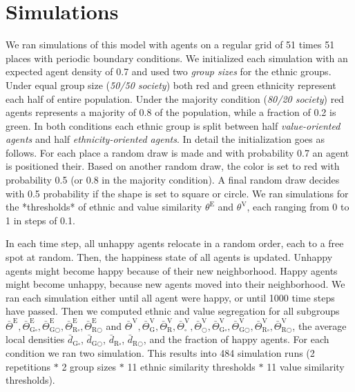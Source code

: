 \documentclass{ws-acs}
\begin{document}
{\section{Simulations}
We ran simulations of this model with agents on a regular grid of 51 times 51 places with periodic boundary conditions. We initialized each simulation with an expected agent density of 0.7 and used two {\it group sizes} for the ethnic groups. Under equal group size ({\it 50/50 society}) both red and green ethnicity represent each half of entire population. Under the majority condition ({\it 80/20 society}) red agents represents a majority of 0.8 of the population, while a fraction of 0.2 is green. In both conditions each ethnic group is split between half {\it value-oriented agents} and half {\it ethnicity-oriented agents}. In detail the initialization goes as follows. For each place a random draw is made and with probability 0.7 an agent is positioned their. Based on another random draw, the color is set to red with probability 0.5 (or 0.8 in the majority condition). A final random draw decides with 0.5 probability if the shape is set to square or circle. We ran simulations for the *thresholds* of ethnic and value similarity $\theta^\text{E}$ and $\theta^\text{V}$, each ranging from 0 to 1 in steps of 0.1. 

In each time step, all unhappy agents relocate in a random order, each to a free spot at random. Then, the happiness state of all agents is updated. Unhappy agents might become happy because of their new neighborhood. Happy agents might become unhappy, because new agents moved into their neighborhood. We ran each simulation either until all agent were happy, or until 1000 time steps have passed. Then we computed ethnic and value segregation for all subgroups $\bar\Theta^\text{E}, \bar\Theta^\text{E}_{\text{G}\square}, \bar\Theta^\text{E}_{\text{G}\bigcirc}, \bar\Theta^\text{E}_{\text{R}\square}, \bar\Theta^\text{E}_{\text{R}\bigcirc}$ and $\bar\Theta^\text{V}, \bar\Theta^\text{V}_{\text{G}}, \bar\Theta^\text{V}_{\text{R}}, \bar\Theta^\text{V}_{\square}, \bar\Theta^\text{V}_{\bigcirc}, \bar\Theta^\text{V}_{\text{G}\square}, \bar\Theta^\text{V}_{\text{G}\bigcirc}, \bar\Theta^\text{V}_{\text{R}\square}, \bar\Theta^\text{V}_{\text{R}\bigcirc}$, the average local densities $\bar d_{\text{G}\square}$, $\bar d_{\text{G}\bigcirc}$, $\bar d_{\text{R}\square}$, $\bar d_{\text{R}\bigcirc}$, and the fraction of happy agents. 
For each condition we ran two simulation. This results into 484 simulation runs (2 repetitions $*$ 2 group sizes $*$ 11 ethnic similarity thresholds $*$ 11 value similarity thresholds).

}
\end{document}
